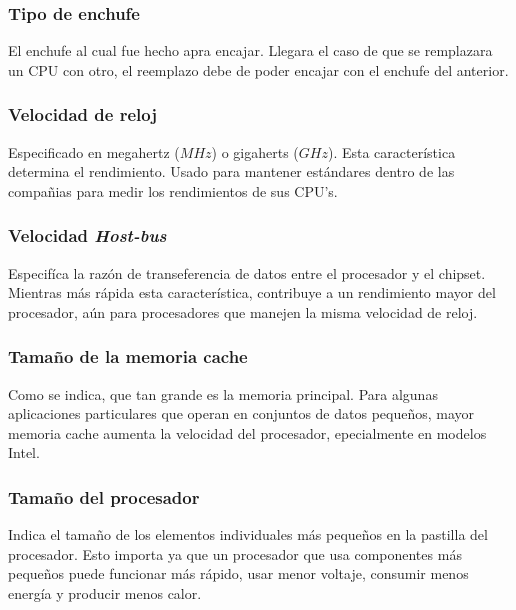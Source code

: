 \documentclass[letterpaper, 12pt]{article}
\begin{document}
\begin{justify}
        \subsubsection*{Tipo de enchufe}
        \justify
        El enchufe al cual fue hecho apra encajar. Llegara el caso de que se remplazara un CPU con otro, el reemplazo debe de poder encajar con el enchufe del anterior.
        \subsubsection*{Velocidad de reloj}
        \justify
        Especificado en megahertz (\(MHz\)) o gigaherts (\(GHz\)). Esta característica determina el rendimiento. Usado para mantener estándares dentro de las compañias para
        medir los rendimientos de sus CPU's.
        \subsubsection*{Velocidad \emph{Host-bus}}
        \justify
        Especifíca la razón de transeferencia de datos entre el procesador y el chipset. Mientras más rápida esta característica, contribuye a un rendimiento mayor del procesador, aún
        para procesadores que manejen la misma velocidad de reloj.
        \subsubsection*{Tamaño de la memoria cache}
        \justify
        Como se indica, que tan grande es la memoria principal. Para algunas aplicaciones particulares que operan en conjuntos de datos pequeños, mayor memoria cache aumenta la velocidad del procesador,
        epecialmente en modelos Intel.
        \subsubsection*{Tamaño del procesador}
        \justify
        Indica el tamaño de los elementos individuales más pequeños en la pastilla del procesador.  Esto importa ya que un procesador que usa componentes más pequeños puede funcionar más rápido, usar menor voltaje,
        consumir menos energía y producir menos calor.


\end{justify}
\end{document}
